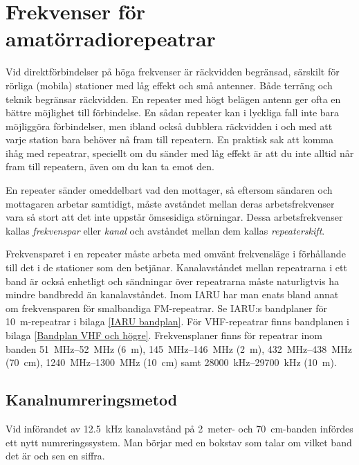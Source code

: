 \chapter[Svenska repeatrar]{Frekvenser för amatörradiorepeatrar}
\label{svenska repeatrar}

\noindent Vid direktförbindelser på höga frekvenser är räckvidden begränsad,
särskilt för rörliga (mobila) stationer med låg effekt och små antenner.
Både terräng och teknik begränsar räckvidden.
En repeater med högt belägen antenn ger ofta en bättre möjlighet till förbindelse.
En sådan repeater kan i lyckliga fall inte bara möjliggöra förbindelser, men
ibland också dubblera räckvidden i och med att varje station bara
behöver nå fram till repeatern.  En praktisk sak att komma ihåg med
repeatrar, speciellt om du sänder med låg effekt är att du inte alltid
når fram till repeatern, även om du kan ta emot den. 

En repeater sänder omeddelbart vad den mottager, så 
eftersom sändaren och mottagaren arbetar samtidigt, måste
avståndet mellan deras arbetsfrekvenser vara så stort att det inte uppstår
ömsesidiga störningar.
Dessa arbetsfrekvenser kallas \emph{frekvenspar} eller \emph{kanal} och avståndet mellan dem
kallas \emph{repeaterskift}.

Frekvensparet i en repeater måste arbeta med omvänt frekvensläge i förhållande
till det i de stationer som den betjänar.
Kanalavståndet mellan repeatrarna i ett band är också enhetligt och sändningar
över repeatrarna måste naturligtvis ha mindre bandbredd än kanalavståndet.
Inom IARU har man enats bland annat om frekvensparen för smalbandiga
FM-repeatrar.
Se IARU:s bandplaner för \SI{10}{\metre}-repeatrar i bilaga \ref{IARU bandplan}.
För VHF-repeatrar finns bandplanen i bilaga \ref{Bandplan VHF och högre}.
Frekvensplaner finns för repeatrar inom banden \SIrange{51}{52}{\mega\hertz}
(\SI{6}{\metre}), \SIrange{145}{146}{\mega\hertz} (\SI{2}{\metre}),
\SIrange{432}{438}{\mega\hertz} (\SI{70}{\centi\metre}),
\SIrange{1240}{1300}{\mega\hertz} (\SI{10}{\centi\metre}) samt
\SIrange{28000}{29700}{\kilo\hertz} (\SI{10}{\metre}).

\section{Kanalnumreringsmetod}
Vid införandet av \SI{12,5}{\kilo\hertz} kanalavstånd på 2~meter- och
\SI{70}{\centi\metre}-banden infördes ett nytt numreringssystem.
Man börjar med en bokstav som talar om vilket band det är och sen en
siffra.


